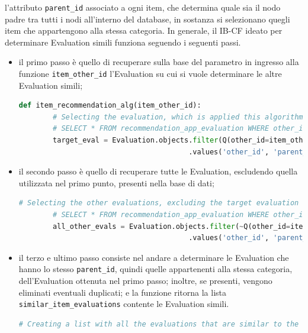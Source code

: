 l'attributo \texttt{parent\_id} associato a ogni item, che determina quale sia il nodo padre tra tutti i nodi all'interno del database, in sostanza 
si selezionano quegli item che appartengono alla stessa categoria.\hfill\break
In generale, il IB-CF ideato per determinare Evaluation simili funziona seguendo i seguenti passi.
\begin{itemize}
    \item il primo passo è quello di recuperare sulla base del parametro in ingresso alla funzione \texttt{item\_other\_id} 
    l'Evaluation su cui si vuole determinare le altre Evaluation simili;
    \begin{lstlisting}[language=Python, label=lst:IB_CF_Evaluation_1]
    def item_recommendation_alg(item_other_id):
        # Selecting the evaluation, which is applied this algorithm, from its other_id
        # SELECT * FROM recommendation_app_evaluation WHERE other_id = %(item_other_id)s AND node_type = 'eva'
        target_eval = Evaluation.objects.filter(Q(other_id=item_other_id) & Q(node_type="eva"))\
                                        .values('other_id', 'parent_id')[0]
    \end{lstlisting} 
    \item il secondo passo è quello di recuperare tutte le Evaluation, escludendo quella utilizzata nel primo punto, presenti nella base di dati;
    \begin{lstlisting}[language=Python, label=lst:IB_CF_Evaluation_2]
        # Selecting the other evaluations, excluding the target evaluation
        # SELECT * FROM recommendation_app_evaluation WHERE other_id != %(item_other_id)s AND node_type = 'eva'
        all_other_evals = Evaluation.objects.filter(~Q(other_id=item_other_id) & Q(node_type="eva"))\
                                        .values('other_id', 'parent_id').order_by('other_id')
    \end{lstlisting}
    \item il terzo e ultimo passo consiste nel andare a determinare le Evaluation che hanno lo stesso \texttt{parent\_id}, quindi 
    quelle appartenenti alla stessa categoria, dell'Evaluation ottenuta nel primo passo; inoltre, se presenti, vengono 
    eliminati eventuali duplicati; e la funzione ritorna la lista \texttt{similar\_item\_evaluations} contente le Evaluation simili.
    \begin{lstlisting}[language=Python, label=lst:IB_CF_Evaluation_3]
        # Creating a list with all the evaluations that are similar to the target evaluation (comparing the parent_id)

\end{lstlisting}
\end{itemize}
